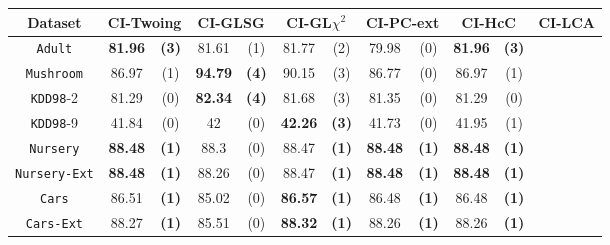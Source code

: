\begin{table*}
\small
\centering
\begin{tabular}{c|cc|cc|cc|cc|cc|cc} 
Dataset  &   \multicolumn{2}{c|}{CI-Twoing} &   \multicolumn{2}{c|}{CI-GLSG} & \multicolumn{2}{c|}{CI-GL$\chi^2$}& \multicolumn{2}{c|}{CI-PC-ext}& \multicolumn{2}{c|}{CI-HcC}& \multicolumn{2}{c}{CI-LCA}\\
\hline   
{\tt Adult}        &{\bf 81.96} &{\bf  (3)} & 81.61       & (1)       & 81.77       & (2)       & 79.98       & (0)       & {\bf 81.96} & {\bf  (3)}  &             &             \\
{\tt Mushroom}     &86.97       & (1)       &{\bf  94.79 }& {\bf (4)} & 90.15       & (3)       & 86.77       & (0)       & 86.97       & (1)         &             &             \\
{\tt KDD98}-2      &81.29       & (0)       & {\bf 82.34 }& {\bf (4)} & 81.68       & (3)       & 81.35       & (0)       & 81.29       & (0)         &             &             \\
{\tt KDD98}-9      &41.84       & (0)       & 42          & (0)       & {\bf 42.26} & {\bf (3)} & 41.73       & (0)       & 41.95       &  (1)        &             &             \\
{\tt Nursery}      &{\bf 88.48} & {\bf (1)} & 88.3        & (0)       & 88.47       & {\bf (1)} &{\bf 88.48 } & {\bf (1)} & {\bf 88.48} & {\bf (1)}   &             &             \\
{\tt Nursery-Ext}  &{\bf 88.48} & {\bf (1)} & 88.26       & (0)       & 88.47       & {\bf (1)} &{\bf 88.48 } & {\bf (1)} & {\bf 88.48} & {\bf (1)}   &             &             \\
{\tt Cars}         &86.51       & {\bf (1)} & 85.02       & (0)       & {\bf 86.57} & {\bf (1)} & 86.48       & {\bf (1)} & 86.48       & {\bf (1)}   &             &             \\
{\tt Cars-Ext}     &88.27       & {\bf (1)} & 85.51       & (0)       & {\bf 88.32} & {\bf (1)} & 88.26       & {\bf (1)} & 88.26       & {\bf (1)}   &             &             \\

\end{tabular}
\end{table*}
